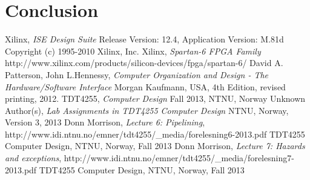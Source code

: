 \documentclass{report}
\begin{document}
\chapter{Conclusion}

\newpage

\begin{thebibliography}{2}
	Xilinx,
	\emph{ISE Design Suite}
	Release Version: 12.4, Application Version: M.81d
	Copyright (c) 1995-2010 Xilinx, Inc.
	Xilinx,
	\emph{Spartan-6 FPGA Family}\newline
	http://www.xilinx.com/products/silicon-devices/fpga/spartan-6/
	David A. Patterson, John L.Hennessy, \newline
	\emph{Computer Organization and Design - The Hardware/Software Interface}
	Morgan Kaufmann, USA,
	4th Edition, revised printing,
	2012.
	TDT4255,
	\emph{Computer Design}
	Fall 2013,
	NTNU, Norway
	Unknown Author(s),
	\emph{Lab Assignments in TDT4255 Computer Design}
	NTNU, Norway,
	Version 3,
	2013
	Donn Morrison,
	\emph{Lecture 6: Pipelining},\newline
	http://www.idi.ntnu.no/emner/tdt4255/\_media/forelesning6-2013.pdf\newline
	TDT4255 Computer Design,
	NTNU, Norway,
	Fall 2013
	Donn Morrison,
	\emph{Lecture 7: Hazards and exceptions},\newline
	http://www.idi.ntnu.no/emner/tdt4255/\_media/forelesning7-2013.pdf\newline
	TDT4255 Computer Design,
	NTNU, Norway,
	Fall 2013
\end{thebibliography}


\end{document}

